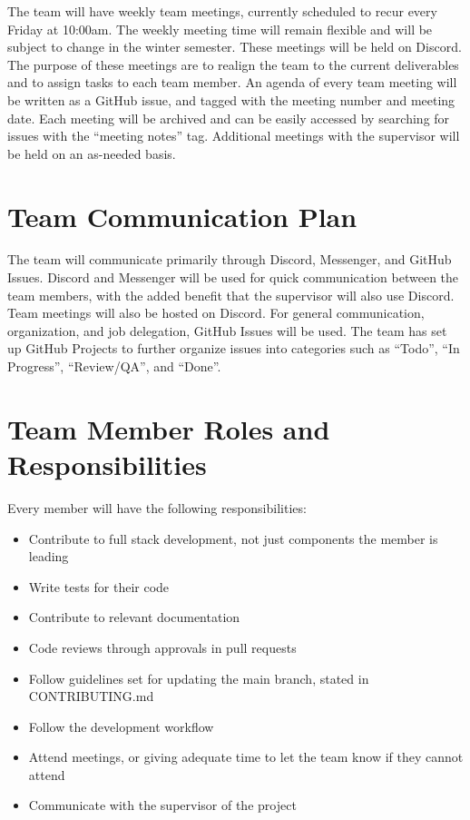 \documentclass{article}
\begin{document}
The team will have weekly team meetings, currently scheduled to recur every Friday at 10:00am. The
weekly meeting time will remain flexible and will be subject to change in the winter semester.
These meetings will be held on Discord. The purpose of these meetings are to realign the team to
the current deliverables and to assign tasks to each team member. An agenda of every team meeting
will be written as a GitHub issue, and tagged with the meeting number and meeting date. Each
meeting will be archived and can be easily accessed by searching for issues with the ``meeting
notes'' tag. Additional meetings with the supervisor will be held on an as-needed basis.

\section{Team Communication Plan}

The team will communicate primarily through Discord, Messenger, and GitHub Issues. Discord and
Messenger will be used for quick communication between the team members, with the added benefit
that the supervisor will also use Discord. Team meetings will also be hosted on Discord. For
general communication, organization, and job delegation, GitHub Issues will be used. The team has
set up GitHub Projects to further organize issues into categories such as ``Todo'', ``In
Progress'', ``Review/QA'', and ``Done''.

\section{Team Member Roles and Responsibilities}

Every member will have the following responsibilities:

\begin{itemize}
	\item Contribute to full stack development, not just components the member is leading
	\item Write tests for their code
	\item Contribute to relevant documentation
	\item Code reviews through approvals in pull requests
	\item Follow guidelines set for updating the main branch, stated in CONTRIBUTING.md
	\item Follow the development workflow
	\item Attend meetings, or giving adequate time to let the team know if they cannot attend
	\item Communicate with the supervisor of the project
\end{itemize}
\end{document}
